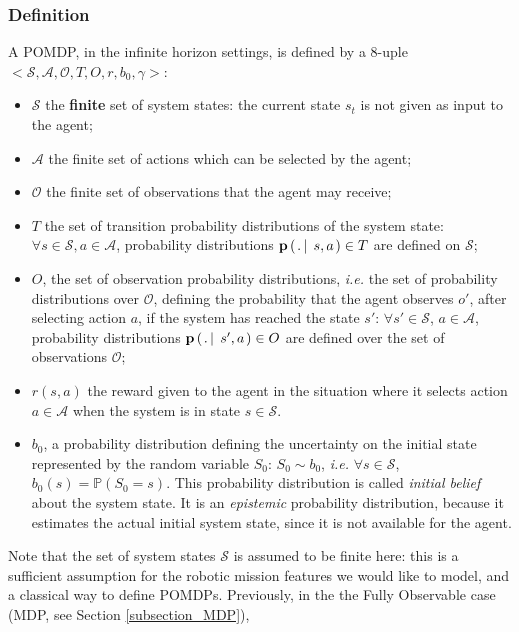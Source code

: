 \subsubsection{Definition}
\label{section_definition_POMDP}
A POMDP, in the infinite horizon settings,
is defined by a $8$-uple $<\mathcal{S},\mathcal{A},\mathcal{O},T,O,r,b_0, \gamma>$:
\begin{itemize}
\item $\mathcal{S}$ 
the \textbf{finite} set of system states: the current state $s_t$
is not given as input to the agent;
\item $\mathcal{A}$ the finite set of actions 
which can be selected by the agent;
\item $\mathcal{O}$ the finite set of observations
that the agent may receive;
\item $T$ the set of transition probability distributions
of the system state: $ \forall s \in \mathcal{S}, a \in \mathcal{A}$, 
probability distributions $\textbf{p} \left( \left.  . \, \right| \left. \, s,a \right. \right) \in T $ 
are defined on $\mathcal{S}$;
\item $O$, the set of observation probability distributions,
\textit{i.e.} the set of probability distributions over $\mathcal{O}$, 
defining the probability that the agent observes $o'$,
after selecting action $a$, 
if the system has reached the state $s'$:
$\forall s' \in \mathcal{S}$, $a \in \mathcal{A}$, 
probability distributions $\textbf{p} \left( \left.  . \, \right| \left. \, s',a  \right. \right) \in O $
are defined over the set of observations $\mathcal{O}$;
\item $r(s,a)$
the reward given to the agent
in the situation where it selects action $a \in \mathcal{A}$ 
when the system is in state $s\in\mathcal{S}$. 
\item $b_0$, a probability distribution 
defining the uncertainty on the initial state
represented by the random variable $S_0$: 
$S_0 \sim b_0$, \textit{i.e.}
$\forall s \in \mathcal{S}$, $b_0(s) = \mathbb{P}(S_0 = s)$. 
This probability distribution 
is called \textit{initial belief} about the system state. 
It is an \textit{epistemic} probability distribution, 
because it estimates the actual initial system state,
since it is not available for the agent.
\end{itemize}
Note that the set of system states $\mathcal{S}$ 
is assumed to be finite here:
this is a sufficient assumption for the robotic mission features
we would like to model,
and a classical way to define POMDPs.
Previously, in the the Fully Observable case 
(MDP, see Section \ref{subsection_MDP}), 
